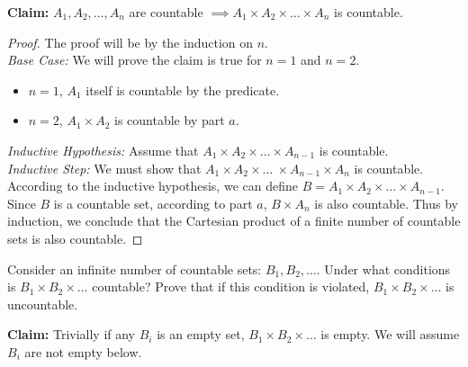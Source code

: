 \documentclass[11pt]{article}
\begin{document}
\begin{Parts}
    \begin{Answer}
        \textbf{Claim:} $A_1,A_2,\ldots,A_n$ are countable $\implies A_1 \times A_2 \times \ldots \times A_n$ is countable. 
        \begin{proof}
            The proof will be by the induction on $n$. \\
            \emph{Base Case:} We will prove the claim is true for $n = 1$ and $n = 2$. 
            \begin{itemize}
                \item $n = 1$, $A_1$ itself is countable by the predicate. 
                \item $n = 2$, $A_1 \times A_2$ is countable by part $a$. 
            \end{itemize}
            \emph{Inductive Hypothesis:} Assume that $A_1 \times A_2 \times \ldots \times A_{n-1}$ is countable. \\
            \emph{Inductive Step:} We must show that $A_1 \times A_2 \times \ldots\
            \times A_{n-1} \times A_n$ is countable. \\
            According to the inductive hypothesis, we can define $B = A_1 \times A_2 \times \ldots \times A_{n-1}$. Since $B$ is a countable
            set, according to part $a$, $B \times A_n$ is also countable. Thus by induction, we conclude that the Cartesian product of a 
            finite number of countable sets is also countable. 
        \end{proof}
    \end{Answer}

    \newpage
    \Part Consider an infinite number of countable sets: $B_1, B_2, \ldots$. Under what conditions is $B_1 \times B_2 \times \ldots$
          countable? Prove that if this condition is violated, $B_1 \times B_2 \times \ldots$ is uncountable. 
    
    \begin{Answer}
        \textbf{Claim:} Trivially if any $B_i$ is an empty set, $B_1 \times B_2 \times \ldots$ is empty. We will assume $B_i$ are not empty below.


\end{Answer}
\end{Parts}
\end{document}
